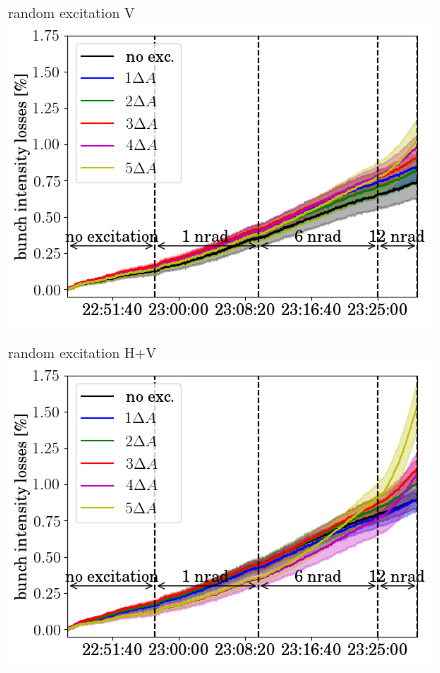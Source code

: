 \documentclass[%
 reprint,
 amsmath,amssymb,
 aps,
prstab,
]{revtex4-1}
\begin{document}
\begin{figure}[b]
	\begin{minipage}[t]{0.49\linewidth}
		\centering
		random excitation V
		\includegraphics[width=1.0\linewidth]{2017_bunch_intensity_vran_no_damper_avg.png}
	\end{minipage}	
	\begin{minipage}[t]{0.49\linewidth}
		\centering
		random excitation H+V
		\includegraphics[width=1.0\linewidth]{2017_bunch_intensity_hvran_no_damper_avg.png}
	\end{minipage}	
	\begin{minipage}[t]{0.49\linewidth}
		\centering

\end{minipage}
\end{figure}
\end{document}

